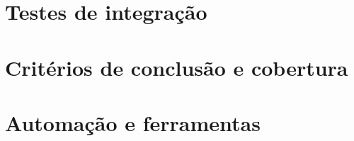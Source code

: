 \documentclass[a4paper,12pt,oneside,openany]{book}
\newif\iforientacoes
\newcommand{\orientacao}[1]{%
    \iforientacoes
        \begin{quote}
        \small\itshape\textbf{Orientação:} #1
        \end{quote}
    \fi
}
\begin{document}
\section{Testes de integração}

\orientacao{Expliquem como os componentes serão integrados e testados. Quando
fizer sentido, indiquem a estratégia adotada (por exemplo, \textit{top-down},
\textit{bottom-up}, \textit{depth-first} ou \textit{breadth-first}) e
justifiquem-na. Descrevam também como testes de regressão serão utilizados
após alterações.}

\section{Critérios de conclusão e cobertura}

\orientacao{Definam critérios que permitam decidir quando a atividade de
teste atingiu um nível satisfatório. A cobertura de código pode ser um dos
indicadores, mas não deve ser tratada isoladamente como garantia de qualidade.
Se uma meta quantitativa for adotada, indiquem o tipo de cobertura e
justifiquem a meta.}

\section{Automação e ferramentas}

\orientacao{Descrevam as ferramentas utilizadas ou planejadas para executar
testes, gerar relatórios e, quando aplicável, automatizar sua execução.}

%
%
%

\end{document}
